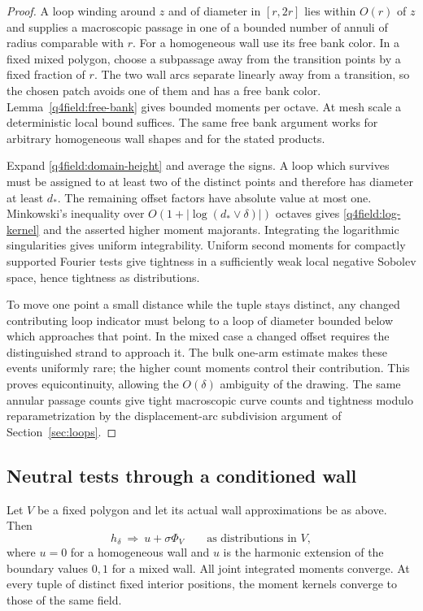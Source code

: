 \begin{proof}
A loop winding around $z$ and of diameter in $[r,2r]$ lies within
$O(r)$ of $z$ and supplies a macroscopic passage in one of a bounded
number of annuli of radius comparable with $r$.  For a homogeneous
wall use its free bank color.  In a fixed mixed polygon, choose a
subpassage away from the transition points by a fixed fraction of
$r$.  The two wall arcs separate linearly away from a transition,
so the chosen patch avoids one of them and has a free bank color.
Lemma~\ref{q4field:free-bank} gives bounded moments per octave.
At mesh scale a deterministic local bound suffices.  The same free
bank argument works for arbitrary homogeneous wall shapes and for
the stated products.

Expand \eqref{q4field:domain-height} and average the signs.  A loop
which survives must be assigned to at least two of the distinct
points and therefore has diameter at least $d_*$.  The remaining
offset factors have absolute value at most one.  Minkowski's
inequality over $O(1+|\log(d_*\vee\delta)|)$ octaves gives
\eqref{q4field:log-kernel} and the asserted higher moment majorants.
Integrating the logarithmic singularities gives uniform
integrability.  Uniform second moments for compactly supported
Fourier tests give tightness in a sufficiently weak local negative
Sobolev space, hence tightness as distributions.

To move one point a small distance while the tuple stays distinct,
any changed contributing loop indicator must belong to a loop of
diameter bounded below which approaches that point.  In the mixed
case a changed offset requires the distinguished strand to approach
it.  The bulk one-arm estimate makes these events uniformly rare;
the higher count moments control their contribution.  This proves
equicontinuity, allowing the $O(\delta)$ ambiguity of the drawing.
The same annular passage counts give tight macroscopic curve counts
and tightness modulo reparametrization by the displacement-arc
subdivision argument of Section~\ref{sec:loops}.
\end{proof}

\subsection{Neutral tests through a conditioned wall}

\begin{theorem}\label{q4field:regular-domain}
Let $V$ be a fixed
polygon and let its actual wall approximations be as above.  Then
\begin{equation}\label{q4field:Q}
 h_\delta\ \Longrightarrow\ u+\sigma\Phi_V
 \qquad\text{as distributions in }V,
\end{equation}
where $u=0$ for a homogeneous wall and $u$ is the harmonic extension
of the boundary values $0,1$ for a mixed wall.  All joint integrated
moments converge.  At every tuple of distinct fixed interior
positions, the moment kernels converge to those of the same field.
\end{theorem}

